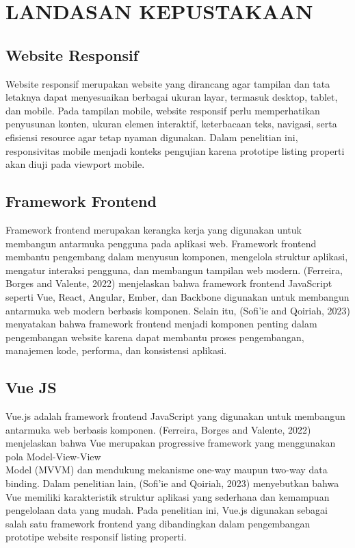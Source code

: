 \documentclass[12pt,a4paper]{report}
\begin{document}
\chapter{LANDASAN KEPUSTAKAAN}

\section{Website Responsif}
Website responsif merupakan website yang dirancang agar tampilan dan tata letaknya dapat menyesuaikan berbagai ukuran layar, termasuk desktop, tablet, dan mobile. Pada tampilan mobile, website responsif perlu memperhatikan penyusunan konten, ukuran elemen interaktif, keterbacaan teks, navigasi, serta efisiensi resource agar tetap nyaman digunakan. Dalam penelitian ini, responsivitas mobile menjadi konteks pengujian karena prototipe listing properti akan diuji pada viewport mobile.

\section{Framework Frontend}
Framework frontend merupakan kerangka kerja yang digunakan untuk membangun antarmuka pengguna pada aplikasi web. Framework frontend membantu pengembang dalam menyusun komponen, mengelola struktur aplikasi, mengatur interaksi pengguna, dan membangun tampilan web modern. (Ferreira, Borges and Valente, 2022) menjelaskan bahwa framework frontend JavaScript seperti Vue, React, Angular, Ember, dan Backbone digunakan untuk membangun antarmuka web modern berbasis komponen. Selain itu, (Sofi'ie and Qoiriah, 2023) menyatakan bahwa framework frontend menjadi komponen penting dalam pengembangan website karena dapat membantu proses pengembangan, manajemen kode, performa, dan konsistensi aplikasi.

\section{Vue JS}
Vue.js adalah framework frontend JavaScript yang digunakan untuk membangun antarmuka web berbasis komponen. (Ferreira, Borges and Valente, 2022) menjelaskan bahwa Vue merupakan progressive framework yang menggunakan pola Model-View-View\\
Model (MVVM) dan mendukung mekanisme one-way maupun two-way data binding. Dalam penelitian lain, (Sofi'ie and Qoiriah, 2023) menyebutkan bahwa Vue memiliki karakteristik struktur aplikasi yang sederhana dan kemampuan pengelolaan data yang mudah. Pada penelitian ini, Vue.js digunakan sebagai salah satu framework frontend yang dibandingkan dalam pengembangan prototipe website responsif listing properti.
\end{document}
